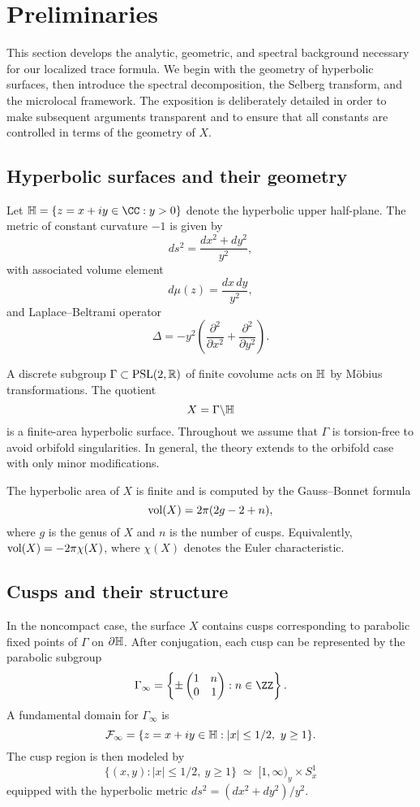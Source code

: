 \section{Preliminaries}\label{sec:prelim}

This section develops the analytic, geometric, and spectral background necessary for our localized trace formula. 
We begin with the geometry of hyperbolic surfaces, then introduce the spectral decomposition, the Selberg transform, 
and the microlocal framework. The exposition is deliberately detailed in order to make subsequent arguments 
transparent and to ensure that all constants are controlled in terms of the geometry of $X$. 

\subsection{Hyperbolic surfaces and their geometry}\label{subsec:surfaces}

Let $\HH = \{z = x+iy \in \CC : y > 0\}$ denote the hyperbolic upper half-plane. 
The metric of constant curvature $-1$ is given by
\[
ds^2 = \frac{dx^2 + dy^2}{y^2},
\]
with associated volume element
\[
d\mu(z) = \frac{dx\,dy}{y^2},
\]
and Laplace--Beltrami operator
\[
\Delta = -y^2 \left( \frac{\partial^2}{\partial x^2} + \frac{\partial^2}{\partial y^2} \right).
\]

A discrete subgroup $\Gamma \subset \mathrm{PSL}(2,\mathbb{R})$ of finite covolume acts on $\mathbb{H}$ by Möbius transformations. 
The quotient
\[
X = \Gamma \backslash \mathbb{H}
\]
is a finite-area hyperbolic surface. 
Throughout we assume that $\Gamma$ is torsion-free to avoid orbifold singularities. 
In general, the theory extends to the orbifold case with only minor modifications.

The hyperbolic area of $X$ is finite and is computed by the Gauss--Bonnet formula
\[
\operatorname{vol}(X) = 2\pi(2g - 2 + n),
\]
where $g$ is the genus of $X$ and $n$ is the number of cusps. 
Equivalently, $\operatorname{vol}(X) = -2\pi \chi(X)$, where $\chi(X)$ denotes the Euler characteristic.

\subsection{Cusps and their structure}\label{subsec:cusps}

In the noncompact case, the surface $X$ contains cusps corresponding to parabolic fixed points of $\Gamma$ on $\partial\mathbb{H}$. 
After conjugation, each cusp can be represented by the parabolic subgroup
\[
\Gamma_\infty = \left\{ \pm \begin{pmatrix}1 & n \\ 0 & 1\end{pmatrix} : n \in \ZZ \right\}.
\]
A fundamental domain for $\Gamma_\infty$ is
\[
\mathcal{F}_\infty = \{ z = x+iy \in \mathbb{H} : |x| \le 1/2, \ y \ge 1\}.
\]
The cusp region is then modeled by
\[
\{(x,y) : |x| \le 1/2, \ y \ge 1\} \;\simeq\; [1,\infty)_y \times S^1_x
\]
equipped with the hyperbolic metric $ds^2 = (dx^2+dy^2)/y^2$. 

